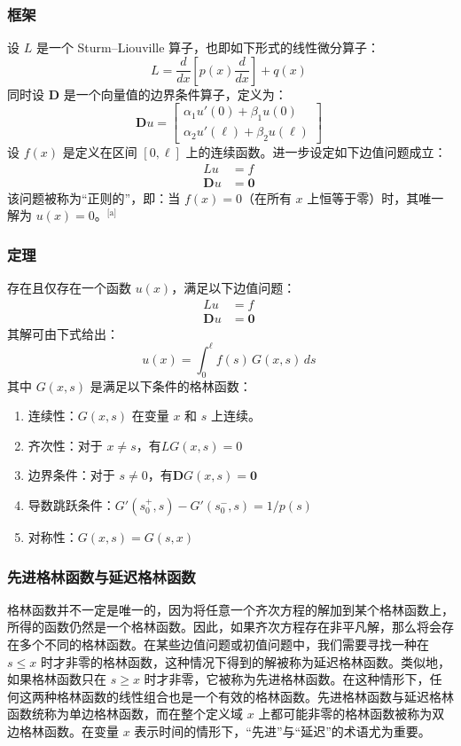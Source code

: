 \subsubsection{框架}
设
$L$ 是一个 Sturm–Liouville 算子，也即如下形式的线性微分算子：
$$
L = \frac{d}{dx}\left[p(x)\frac{d}{dx}\right] + q(x)~
$$
同时设
$\mathbf{D}$ 是一个向量值的边界条件算子，定义为：
$$
\mathbf{D}u = 
\begin{bmatrix}
\alpha_1 u'(0) + \beta_1 u(0) \\
\alpha_2 u'(\ell) + \beta_2 u(\ell)
\end{bmatrix}~
$$
设 $f(x)$ 是定义在区间 $[0, \ell]$ 上的连续函数。进一步设定如下边值问题成立：
$$
\begin{aligned}
Lu &= f \\
\mathbf{D}u &= \mathbf{0}
\end{aligned}~
$$
该问题被称为“正则的”，即：当 $f(x) = 0$（在所有 $x$ 上恒等于零）时，其唯一解为 $u(x) = 0$。\(^\text{[a]}\)
\subsubsection{定理}
存在且仅存在一个函数 $u(x)$，满足以下边值问题：
$$
\begin{aligned}
Lu &= f \\
\mathbf{D}u &= \mathbf{0}
\end{aligned}~
$$
其解可由下式给出：
$$
u(x) = \int_0^{\ell} f(s)\, G(x, s)\, ds~
$$
其中 $G(x, s)$ 是满足以下条件的格林函数：
\begin{enumerate}
\item 连续性：$G(x, s)$ 在变量 $x$ 和 $s$ 上连续。
\item 齐次性：对于 $x \ne s$，有$L G(x, s) = 0$
\item 边界条件：对于 $s \ne 0$，有$\mathbf{D} G(x, s) = \mathbf{0}$
\item 导数跳跃条件：$G'(s_0^+, s) - G'(s_0^-, s) = 1/p(s)$
\item 对称性：$G(x, s) = G(s, x)$
\end{enumerate}
\subsubsection{先进格林函数与延迟格林函数}
格林函数并不一定是唯一的，因为将任意一个齐次方程的解加到某个格林函数上，所得的函数仍然是一个格林函数。因此，如果齐次方程存在非平凡解，那么将会存在多个不同的格林函数。在某些边值问题或初值问题中，我们需要寻找一种在 $s \leq x$ 时才非零的格林函数，这种情况下得到的解被称为延迟格林函数。类似地，如果格林函数只在 $s \geq x$ 时才非零，它被称为先进格林函数。在这种情形下，任何这两种格林函数的线性组合也是一个有效的格林函数。先进格林函数与延迟格林函数统称为单边格林函数，而在整个定义域 $x$ 上都可能非零的格林函数被称为双边格林函数。在变量 $x$ 表示时间的情形下，“先进”与“延迟”的术语尤为重要。

